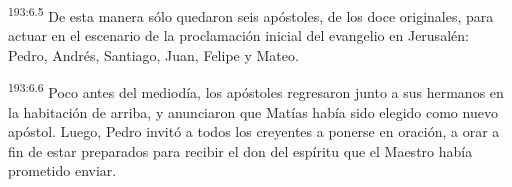 \par 
\textsuperscript{193:6.5} De esta manera sólo quedaron seis apóstoles, de los doce originales, para actuar en el escenario de la proclamación inicial del evangelio en Jerusalén: Pedro, Andrés, Santiago, Juan, Felipe y Mateo.

\par 
\textsuperscript{193:6.6} Poco antes del mediodía, los apóstoles regresaron junto a sus hermanos en la habitación de arriba, y anunciaron que Matías había sido elegido como nuevo apóstol. Luego, Pedro invitó a todos los creyentes a ponerse en oración, a orar a fin de estar preparados para recibir el don del espíritu que el Maestro había prometido enviar.